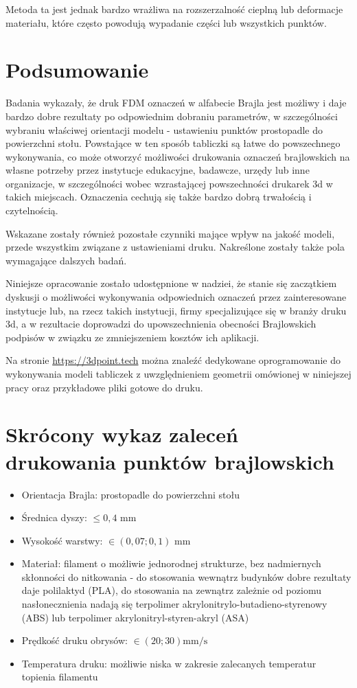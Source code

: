 \documentclass[12pt,a4paper]{article}
\begin{document}
Metoda ta jest jednak bardzo wrażliwa na rozszerzalność cieplną lub deformacje materiału, które często powodują wypadanie części lub wszystkich punktów.

\section{Podsumowanie}
Badania wykazały, że druk FDM oznaczeń w alfabecie Brajla jest możliwy i daje bardzo dobre rezultaty po odpowiednim dobraniu parametrów, w szczególności wybraniu właściwej orientacji modelu - ustawieniu punktów prostopadle do powierzchni stołu.
Powstające w ten sposób tabliczki są łatwe do powszechnego wykonywania, co może otworzyć możliwości drukowania oznaczeń brajlowskich na własne potrzeby przez instytucje edukacyjne, badawcze, urzędy lub inne organizacje, w szczególności wobec wzrastającej powszechności drukarek 3d w takich miejscach.
Oznaczenia cechują się także bardzo dobrą trwałością i czytelnością.

Wskazane zostały również pozostałe czynniki mające wpływ na jakość modeli, przede wszystkim związane z ustawieniami druku. Nakreślone zostały także pola wymagające dalszych badań.

Niniejsze opracowanie zostało udostępnione w nadziei, że stanie się zaczątkiem dyskusji o możliwości wykonywania odpowiednich oznaczeń przez zainteresowane instytucje lub, na rzecz takich instytucji, firmy specjalizujące się w branży druku 3d, a w rezultacie doprowadzi do upowszechnienia obecności Brajlowskich podpisów w związku ze zmniejszeniem kosztów ich aplikacji.

Na stronie \url{https://3dpoint.tech} można znaleźć dedykowane oprogramowanie do wykonywania modeli tabliczek z uwzględnieniem geometrii omówionej w niniejszej pracy oraz przykładowe pliki gotowe do druku.

\newpage

\section*{Skrócony wykaz zaleceń drukowania punktów brajlowskich}
\label{sec:recommendations}
\begin{itemize}
\item Orientacja Brajla: prostopadle do powierzchni stołu
\item Średnica dyszy: $\leq 0{,}4 \text{ mm}$
\item Wysokość warstwy: $\in (0{,}07; 0{,}1) \text{ mm}$
\item Materiał: filament o możliwie jednorodnej strukturze, bez nadmiernych skłonności do nitkowania - do stosowania wewnątrz budynków dobre rezultaty daje polilaktyd (PLA), do stosowania na zewnątrz zależnie od poziomu nasłonecznienia nadają się terpolimer akrylonitrylo-butadieno-styrenowy (ABS) lub terpolimer akrylonitryl-styren-akryl (ASA)
\item Prędkość druku obrysów: $\in (20; 30) \text{mm/s}$
\item Temperatura druku: możliwie niska w zakresie zalecanych temperatur topienia filamentu
\end{itemize}
\end{document}
